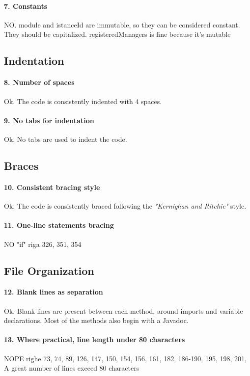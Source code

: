 \documentclass[english]{article}
\begin{document}
\paragraph{7. Constants}
NO.
module and istanceId are immutable, so they can be considered constant. They should be capitalized.
registeredManagers is fine because it's mutable

\subsection{Indentation}
\paragraph{8. Number of spaces}
Ok.
The code is consistently indented with 4 spaces.

\paragraph{9. No tabs for indentation}
Ok.
No tabs are used to indent the code.

\subsection{Braces}
\paragraph{10. Consistent bracing style}
Ok.
The code is consistently braced following the \textit{"Kernighan and Ritchie"} style.

\paragraph{11. One-line statements bracing}
NO
"if" riga 326, 351, 354

\subsection{File Organization}
\paragraph{12. Blank lines as separation}
Ok.
Blank lines are present between each method, around imports and variable declarations.
Most of the methods also begin with a Javadoc.

\paragraph{13. Where practical, line length under 80 characters}
NOPE
righe 73, 74, 89, 126, 147, 150, 154, 156, 161, 182, 186-190, 195, 198, 201, 
A great number of lines exceed 80 characters
\end{document}

